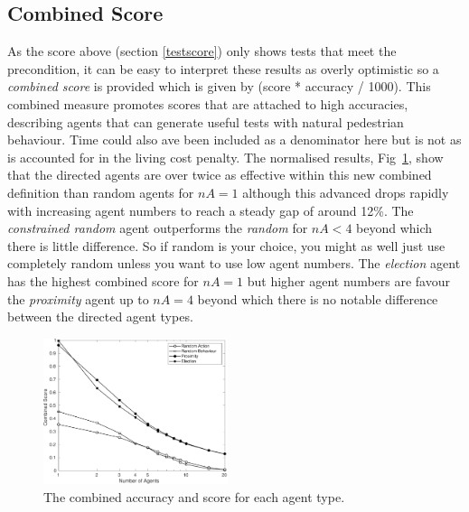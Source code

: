 \documentclass[letterpaper, 10 pt, journal, twoside]{IEEEtran}
\begin{document}
\subsection{Combined Score}
As the score above (section \ref{testscore}) only shows tests that meet the precondition, it can be easy to interpret these results as overly optimistic so a \textit{combined score} is provided which is given by (score * accuracy / 1000). This combined measure promotes scores that are attached to high accuracies, describing agents that can generate useful tests with natural pedestrian behaviour. Time could also ave been included as a denominator here but is not as is accounted for in the living cost penalty.%
%
The normalised results, Fig~\ref{Combined}, show that the directed agents are over twice as effective within this new combined definition than random agents for $nA=1$ although this advanced drops rapidly with increasing agent numbers to reach a steady gap of around 12\%.
%
The \textit{constrained random} agent outperforms the \textit{random} for $nA<4$ beyond which there is little difference. So if random is your choice, you might as well just use completely random unless you want to use low agent numbers. %
%
The \textit{election} agent has the highest combined score for $nA=1$ but higher agent numbers are favour the \textit{proximity} agent up to $nA=4$ beyond which there is no notable difference between the directed agent types. %
%

\begin{figure}[!t]
	\centering
\includegraphics[width=0.48\textwidth]{Combined.pdf}
	\caption{The combined accuracy and score for each agent type.}
	\label{Combined}
\end{figure}



\end{document}
